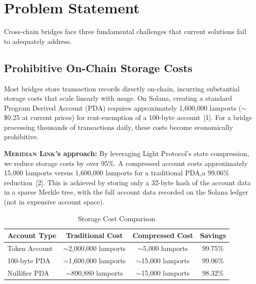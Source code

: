 \documentclass[11pt,a4paper,twoside]{article}
\newcommand{\protocol}{\textsc{Meridian Link}}
\begin{document}
\newpage
\tableofcontents
\newpage

\section{Problem Statement}
\label{sec:problem}

Cross-chain bridges face three fundamental challenges that current solutions fail to adequately address.

\subsection{Prohibitive On-Chain Storage Costs}

Most bridges store transaction records directly on-chain, incurring substantial storage costs that scale linearly with usage. On Solana, creating a standard Program Derived Account (PDA) requires approximately 1,600,000 lamports ($\sim$\$0.25 at current prices) for rent-exemption of a 100-byte account~[1]. For a bridge processing thousands of transactions daily, these costs become economically prohibitive.

\textbf{\protocol{}'s approach:} By leveraging Light Protocol's state compression, we reduce storage costs by over 95\%. A compressed account costs approximately 15,000 lamports versus 1,600,000 lamports for a traditional PDA,a 99.06\% reduction~[2]. This is achieved by storing only a 32-byte hash of the account data in a sparse Merkle tree, with the full account data recorded on the Solana ledger (not in expensive account space).

\begin{table}[H]
\centering
\caption{Storage Cost Comparison}
\label{tab:storage-costs}
\begin{tabular}{@{}lccc@{}}
\toprule
\textbf{Account Type} & \textbf{Traditional Cost} & \textbf{Compressed Cost} & \textbf{Savings} \\
\midrule
Token Account & $\sim$2,000,000 lamports & $\sim$5,000 lamports & 99.75\% \\
100-byte PDA & $\sim$1,600,000 lamports & $\sim$15,000 lamports & 99.06\% \\
Nullifier PDA & $\sim$890,880 lamports & $\sim$15,000 lamports & 98.32\% \\
\bottomrule
\end{tabular}
\end{table}
\end{document}

